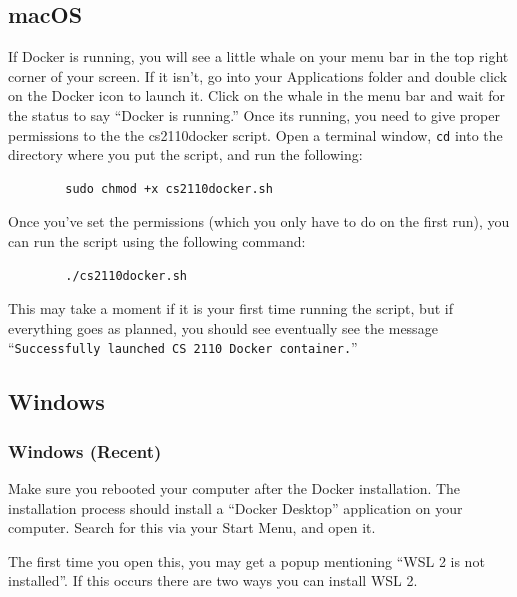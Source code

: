 \subsection{macOS}
If Docker is running, you will see a little whale on your menu bar in the top right corner of your screen. If it isn’t, go into your Applications folder and double click on the Docker icon to launch it. Click on the whale in the menu bar and wait for the status to say ``Docker is running.'' Once its running, you need to give proper permissions to the the cs2110docker script. Open a terminal window, \texttt{cd} into the directory where you put the script, and run the following:

\begin{center}
    \begin{verbatim}
        sudo chmod +x cs2110docker.sh
    \end{verbatim}
\end{center}

Once you’ve set the permissions (which you only have to do on the first run), you can run the script using the following command:

\begin{center}
    \begin{verbatim}
        ./cs2110docker.sh
    \end{verbatim}
\end{center}

This may take a moment if it is your first time running the script, but if everything goes as planned, you should see eventually see the message ``\texttt{Successfully launched CS 2110 Docker container.}''

\subsection{Windows}

\subsubsection{Windows (Recent)} \label{windows-new-starting}

Make sure you rebooted your computer after the Docker installation. The installation process should install a ``Docker Desktop'' application on your computer. Search for this via your Start Menu, and open it.

The first time you open this, you may get a popup mentioning ``WSL 2 is not installed''. If this occurs there are two ways you can install WSL 2.

